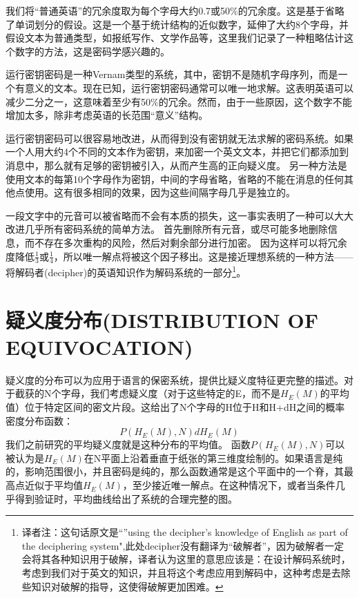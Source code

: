 \documentclass[]{article}
\begin{document}
我们将“普通英语”的冗余度取为每个字母大约0.7或50\%的冗余度。这是基于省略了单词划分的假设。这是一个基于统计结构的近似数字，延伸了大约8个字母，并假设文本为普通类型，如报纸写作、文学作品等，这里我们记录了一种粗略估计这个数字的方法，这是密码学感兴趣的。

运行密钥密码是一种Vernam类型的系统，其中，密钥不是随机字母序列，而是一个有意义的文本。现在已知，运行密钥密码通常可以唯一地求解。这表明英语可以减少二分之一，这意味着至少有50\%的冗余。然而，由于一些原因，这个数字不能增加太多，除非考虑英语的长范围“意义”结构。

运行密钥密码可以很容易地改进，从而得到没有密钥就无法求解的密码系统。如果一个人用大约4个不同的文本作为密钥，来加密一个英文文本，并把它们都添加到消息中，那么就有足够的密钥被引入，从而产生高的正向疑义度。
另一种方法是使用文本的每第10个字母作为密钥，中间的字母省略，省略的不能在消息的任何其他点使用。这有很多相同的效果，因为这些间隔字母几乎是独立的。

一段文字中的元音可以被省略而不会有本质的损失，这一事实表明了一种可以大大改进几乎所有密码系统的简单方法。
首先删除所有元音，或尽可能多地删除信息，而不存在多次重构的风险，然后对剩余部分进行加密。
因为这样可以将冗余度降低$\frac{1}{3}$或$\frac{1}{4}$，所以唯一解点将被这个因子移出。这是接近理想系统的一种方法——将解码者(decipher)的英语知识作为解码系统的一部分\footnote{译者注：这句话原文是“”using the decipher's knowledge of English as part of the deciphering system",此处decipher没有翻译为“破解者”，因为破解者一定会将其各种知识用于破解，译者认为这里的意思应该是：在设计解码系统时，考虑到我们对于英文的知识，并且将这个考虑应用到解码中，这种考虑是去除些知识对破解的指导，这使得破解更加困难。}。


\newpage
%   
%

\section{疑义度分布(DISTRIBUTION OF EQUIVOCATION)}

疑义度的分布可以为应用于语言的保密系统，提供比疑义度特征更完整的描述。对于截获的N个字母，我们考虑疑义度（对于这些特定的E，而不是$H_E(M)$的平均值）位于特定区间的密文片段。这给出了N个字母的H位于H和H+dH之间的概率密度分布函数：
\[P(H_E(M),N) dH_E(M)\]
我们之前研究的平均疑义度就是这种分布的平均值。
函数$P(H_E(M),N)$可以被认为是$H_E(M)$在N平面上沿着垂直于纸张的第三维度绘制的。如果语言是纯的，影响范围很小，并且密码是纯的，那么函数通常是这个平面中的一个脊，其最高点近似于平均值$H_E(M)$，至少接近唯一解点。在这种情况下，或者当条件几乎得到验证时，平均曲线给出了系统的合理完整的图。
\end{document}
